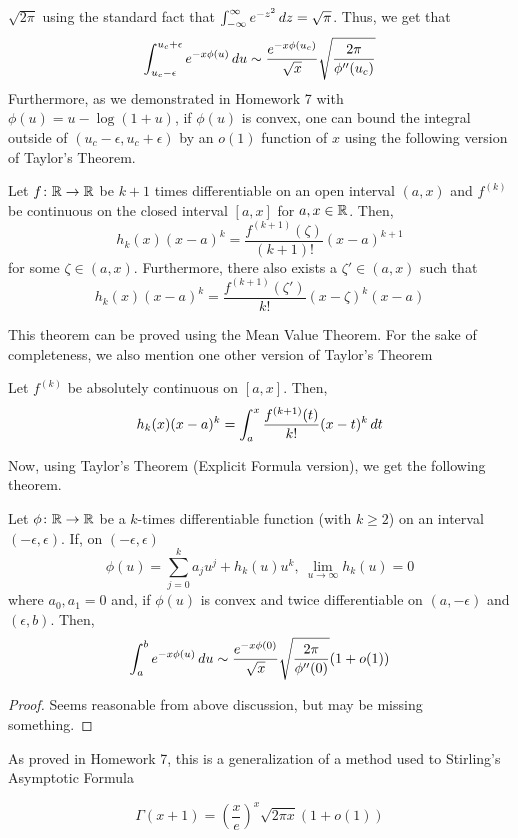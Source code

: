 \documentclass[11pt,leqno,oneside]{amsbook}
\numberwithin{thm}{section}
\begin{document}
\(\sqrt{2\pi}\) using the standard fact that \(\int_{-\infty}^\infty
e^{-z^2} \, d z = \sqrt{\pi}\). Thus, we get that \[
  \int_{u_c-\epsilon}^{u_c+\epsilon} e^{-x \phi(u)} \, d u \sim
  \frac{e^{-x \phi(u_c)}}{\sqrt{x}} \sqrt{\frac{2\pi}{\phi''(u_c)}}
\]
Furthermore, as we demonstrated in Homework 7 with \(\phi(u) =
u-\log(1+u)\), if \(\phi(u)\) is convex, one can bound the integral outside of
\((u_c-\epsilon,u_c+\epsilon)\) by an \(o(1)\) function of \(x\) using
the following version of Taylor's Theorem.
\begin{thm}
  Let \(f \colon {\mathbb R} \to {\mathbb R}\) be \(k+1\) times differentiable on an
  open interval \((a,x)\) and \(f^{(k)}\) be continuous on the closed
  interval \([a,x]\) for \(a,x \in {\mathbb R}\). Then, \[
    h_k(x)(x-a)^k = \frac{f^{(k+1)}(\zeta)}{(k+1)!}(x-a)^{k+1}
  \]
  for some \(\zeta \in (a,x)\). Furthermore, there also exists a
  \(\zeta' \in (a,x)\) such that \[
    h_k(x)(x-a)^k = \frac{f^{(k+1)}(\zeta')}{k!}(x-\zeta)^k(x-a)
  \]
\end{thm}
This theorem can be proved using the Mean Value Theorem. For the sake
of completeness, we also mention one other version of Taylor's Theorem
\begin{thm}
  Let \(f^{(k)}\) be absolutely continuous on \([a,x]\). Then, \[
    h_k(x)(x-a)^k = \int_a^x \frac{f^{(k+1)}(t)}{k!} (x-t)^k \, d t
  \]
\end{thm}
Now, using Taylor's Theorem (Explicit Formula version), we get
the following theorem.
\begin{thm}
  Let \(\phi \colon {\mathbb R} \to {\mathbb R}\) be a \(k\)-times differentiable
   function (with \(k \geq 2\)) on an interval
   \((-\epsilon,\epsilon)\). If, on \((-\epsilon,\epsilon)\)
  \[
    \phi(u) = \sum_{j=0}^k a_j u^j + h_k(u) u^k, \ \lim_{u \to \infty}
    h_k(u) = 0
  \]
  where \(a_0,a_1 = 0\) and, if \(\phi(u)\) is convex and twice differentiable on \((a,-\epsilon)\)
  and \((\epsilon,b)\). Then, \[
    \int_{a}^b e^{-x \phi(u)} \, d u \sim \frac{e^{-x
        \phi(0)}}{\sqrt{x}} \sqrt{\frac{2\pi}{\phi''(0)}} (1+o(1))
  \]
\end{thm}
\begin{proof}
  Seems reasonable from above discussion, but may be missing something.
\end{proof}
As proved in Homework 7, this is a generalization of a method used
to Stirling's
Asymptotic Formula
\begin{cor}
\[  \Gamma(x+1) = \left( \frac{x}{e} \right)^x \sqrt{2\pi x}(1+o(1))\]
\end{cor}
\end{document}
